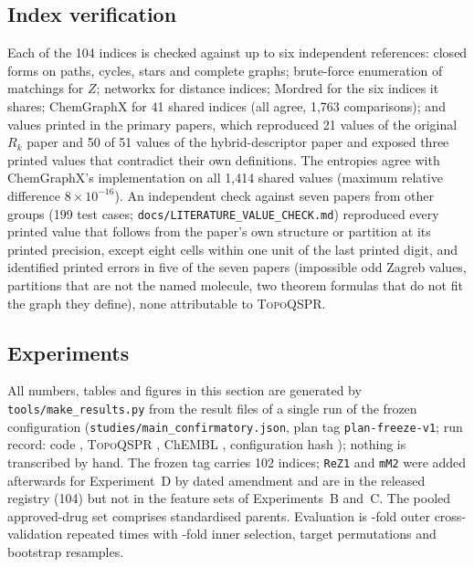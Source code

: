 \documentclass[preprint,12pt]{elsarticle}
\newcommand{\ml}{\textsc{TopoQSPR}}
\begin{document}
\subsection{Index verification}
Each of the 104 indices is checked against up to six independent references: closed forms on paths, cycles, stars and complete graphs; brute-force enumeration of matchings for $Z$; networkx for distance indices; Mordred for the six indices it shares; ChemGraphX for 41 shared indices (all agree, 1{,}763 comparisons); and values printed in the primary papers, which reproduced 21 values of the original $R_k$ paper \cite{arockiaraj2023ijqc} and 50 of 51 values of the hybrid-descriptor paper \cite{arockiaraj2023hybrid} and exposed three printed values that contradict their own definitions. The entropies agree with ChemGraphX's implementation on all 1{,}414 shared values (maximum relative difference $8\times10^{-16}$). An independent check against seven papers from other groups (199 test cases; \texttt{docs/LITERATURE\_VALUE\_CHECK.md}) reproduced every printed value that follows from the paper's own structure or partition at its printed precision, except eight cells within one unit of the last printed digit, and identified printed errors in five of the seven papers (impossible odd Zagreb values, partitions that are not the named molecule, two theorem formulas that do not fit the graph they define), none attributable to \ml{}.

\subsection{Experiments}
All numbers, tables and figures in this section are generated by \texttt{tools/make\_results.py} from the result files of a single run of the frozen configuration (\texttt{studies/main\_confirmatory.json}, plan tag \texttt{plan-freeze-v1}; run record: code \texttt{\runCommit}, \ml{} \topoqsprVersion, ChEMBL \chemblRelease, configuration hash \texttt{\configHash}); nothing is transcribed by hand. The frozen tag carries 102 indices; \texttt{ReZ1} and \texttt{mM2} were added afterwards for Experiment~D by dated amendment and are in the released registry (104) but not in the feature sets of Experiments~B and~C. The pooled approved-drug set comprises \nMolecules{} standardised parents. Evaluation is \outerSplits-fold outer cross-validation repeated \outerRepeats{} times with \innerSplits-fold inner selection, \nPermutations{} target permutations and \nBoot{} bootstrap resamples.
\end{document}
